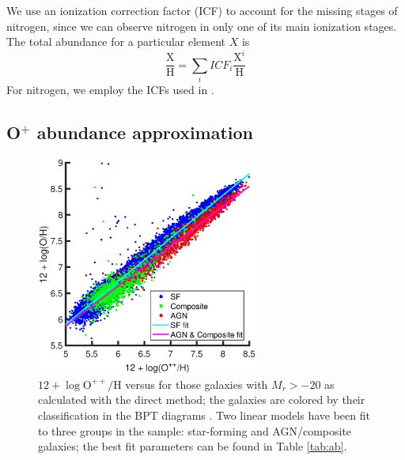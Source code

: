 We use an ionization correction factor (ICF) to account for the missing stages 
of nitrogen, since we can observe nitrogen in only one of its main ionization 
stages.  The total abundance for a particular element $X$ is 
\begin{equation}
    \frac{\text{X}}{\text{H}} = \sum_i ICF_i \frac{\text{X}^i}{\text{H}}
\end{equation}
For nitrogen, we employ the ICFs used in \cite{Douglass17b}.


\subsection{O$^+$ abundance approximation}\label{sec:Oplus_approx}

\begin{figure}
    \centering
    \includegraphics[width=0.65\textwidth]{Images/Paper3/Zlow_v_Zreal_1sig_I06_BPTclass_fits}
    \caption[O$^++$/H versus O/H]{$12 + \log{\text{O}^{++}/\text{H}}$ versus \OH 
    for those galaxies with $M_r > -20$ as calculated with the direct method; 
    the galaxies are colored by their classification in the BPT diagrams 
    \citep[from][]{Brinchmann04}.  Two linear models have been fit to three 
    groups in the sample: star-forming and AGN/composite galaxies; the best fit 
    parameters can be found in Table \ref{tab:ab}.}
    \label{fig:lowVreal}
\end{figure}

